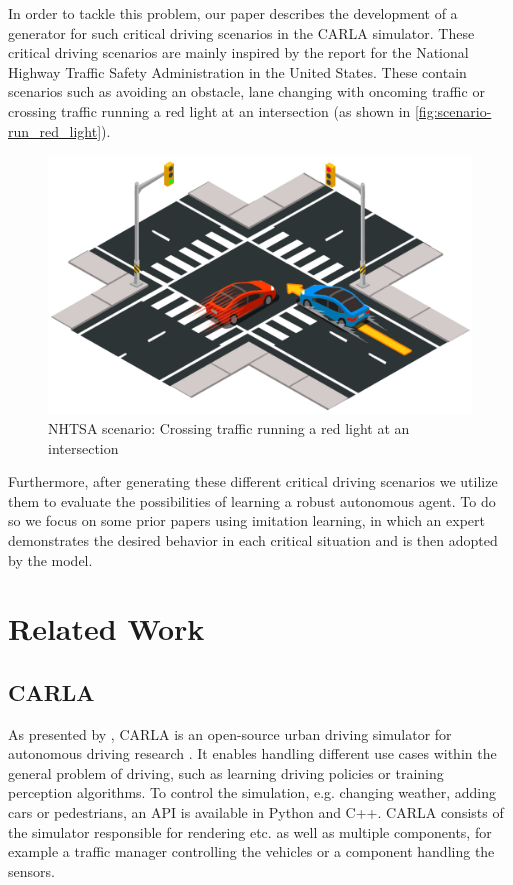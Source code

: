 \documentclass[conference, a4paper, 11pt]{IEEEtran}
\begin{document}
	In order to tackle this problem, our paper describes the development of a generator for such critical driving scenarios in the CARLA simulator.
	These critical driving scenarios are mainly inspired by the report  \cite{NHTSA:PreCrashScenarios} for the National Highway Traffic Safety Administration in the United States.
	These contain scenarios such as avoiding an obstacle, lane changing with oncoming traffic or crossing traffic running a red light at an intersection (as shown in \autoref{fig:scenario-run_red_light}).
	
	\begin{figure}[ht]
		\centering
		\includegraphics[width=0.7\linewidth]{figures/scenario-run_red_light.png}
		\caption{NHTSA scenario: Crossing traffic running a red light at an intersection \cite{CARLAChallenge:Scenarios}}
		\label{fig:scenario-run_red_light}
	\end{figure}
	
	Furthermore, after generating these different critical driving scenarios we utilize them to evaluate the possibilities of learning a robust autonomous agent.
	To do so we focus on some prior papers using imitation learning, in which an expert demonstrates the desired behavior in each critical situation and is then adopted by the model.
	
	\section{Related Work}
	
	\subsection{CARLA}
	As presented by \citeauthor{Dosovitskiy17:CARLA}, CARLA is an open-source urban driving simulator for autonomous driving research \cite{Dosovitskiy17:CARLA}.
	It enables handling different use cases within the general problem of driving, such as learning driving policies or training perception algorithms.
	To control the simulation, e.g. changing weather, adding cars or pedestrians, an API is available in Python and C++.
	CARLA consists of the simulator responsible for rendering etc. as well as multiple components, for example a traffic manager controlling the vehicles or a component handling the sensors.
	
\end{document}
